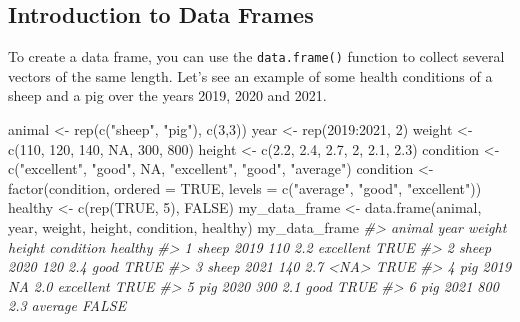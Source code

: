 \documentclass[
]{book}
\newenvironment{Shaded}{\begin{snugshade}}{\end{snugshade}}
\newcommand{\AttributeTok}[1]{\textcolor[rgb]{0.77,0.63,0.00}{#1}}
\newcommand{\CommentTok}[1]{\textcolor[rgb]{0.56,0.35,0.01}{\textit{#1}}}
\newcommand{\ConstantTok}[1]{\textcolor[rgb]{0.00,0.00,0.00}{#1}}
\newcommand{\DecValTok}[1]{\textcolor[rgb]{0.00,0.00,0.81}{#1}}
\newcommand{\FloatTok}[1]{\textcolor[rgb]{0.00,0.00,0.81}{#1}}
\newcommand{\FunctionTok}[1]{\textcolor[rgb]{0.00,0.00,0.00}{#1}}
\newcommand{\NormalTok}[1]{#1}
\newcommand{\OtherTok}[1]{\textcolor[rgb]{0.56,0.35,0.01}{#1}}
\newcommand{\SpecialCharTok}[1]{\textcolor[rgb]{0.00,0.00,0.00}{#1}}
\newcommand{\StringTok}[1]{\textcolor[rgb]{0.31,0.60,0.02}{#1}}
\begin{document}
\hypertarget{introduction-to-data-frames}{%
\subsection{Introduction to Data Frames}\label{introduction-to-data-frames}}

To create a data frame, you can use the \texttt{data.frame()} function to collect several vectors of the same length. Let's see an example of some health conditions of a sheep and a pig over the years 2019, 2020 and 2021.

\begin{Shaded}
\begin{Highlighting}[]
\NormalTok{animal }\OtherTok{\textless{}{-}} \FunctionTok{rep}\NormalTok{(}\FunctionTok{c}\NormalTok{(}\StringTok{"sheep"}\NormalTok{, }\StringTok{"pig"}\NormalTok{), }\FunctionTok{c}\NormalTok{(}\DecValTok{3}\NormalTok{,}\DecValTok{3}\NormalTok{))}
\NormalTok{year }\OtherTok{\textless{}{-}} \FunctionTok{rep}\NormalTok{(}\DecValTok{2019}\SpecialCharTok{:}\DecValTok{2021}\NormalTok{, }\DecValTok{2}\NormalTok{)}
\NormalTok{weight }\OtherTok{\textless{}{-}} \FunctionTok{c}\NormalTok{(}\DecValTok{110}\NormalTok{, }\DecValTok{120}\NormalTok{, }\DecValTok{140}\NormalTok{, }\ConstantTok{NA}\NormalTok{, }\DecValTok{300}\NormalTok{, }\DecValTok{800}\NormalTok{)}
\NormalTok{height }\OtherTok{\textless{}{-}} \FunctionTok{c}\NormalTok{(}\FloatTok{2.2}\NormalTok{, }\FloatTok{2.4}\NormalTok{, }\FloatTok{2.7}\NormalTok{, }\DecValTok{2}\NormalTok{, }\FloatTok{2.1}\NormalTok{, }\FloatTok{2.3}\NormalTok{)}
\NormalTok{condition }\OtherTok{\textless{}{-}} \FunctionTok{c}\NormalTok{(}\StringTok{"excellent"}\NormalTok{, }\StringTok{"good"}\NormalTok{, }\ConstantTok{NA}\NormalTok{, }\StringTok{"excellent"}\NormalTok{, }\StringTok{"good"}\NormalTok{, }\StringTok{"average"}\NormalTok{)}
\NormalTok{condition }\OtherTok{\textless{}{-}} \FunctionTok{factor}\NormalTok{(condition, }\AttributeTok{ordered =} \ConstantTok{TRUE}\NormalTok{, }\AttributeTok{levels =} \FunctionTok{c}\NormalTok{(}\StringTok{"average"}\NormalTok{, }\StringTok{"good"}\NormalTok{, }\StringTok{"excellent"}\NormalTok{))}
\NormalTok{healthy }\OtherTok{\textless{}{-}} \FunctionTok{c}\NormalTok{(}\FunctionTok{rep}\NormalTok{(}\ConstantTok{TRUE}\NormalTok{, }\DecValTok{5}\NormalTok{), }\ConstantTok{FALSE}\NormalTok{)}
\NormalTok{my\_data\_frame }\OtherTok{\textless{}{-}} \FunctionTok{data.frame}\NormalTok{(animal, year, weight, height, condition, healthy)}
\NormalTok{my\_data\_frame}
\CommentTok{\#\textgreater{}   animal year weight height condition healthy}
\CommentTok{\#\textgreater{} 1  sheep 2019    110    2.2 excellent    TRUE}
\CommentTok{\#\textgreater{} 2  sheep 2020    120    2.4      good    TRUE}
\CommentTok{\#\textgreater{} 3  sheep 2021    140    2.7      \textless{}NA\textgreater{}    TRUE}
\CommentTok{\#\textgreater{} 4    pig 2019     NA    2.0 excellent    TRUE}
\CommentTok{\#\textgreater{} 5    pig 2020    300    2.1      good    TRUE}
\CommentTok{\#\textgreater{} 6    pig 2021    800    2.3   average   FALSE}
\end{Highlighting}
\end{Shaded}
\end{document}
